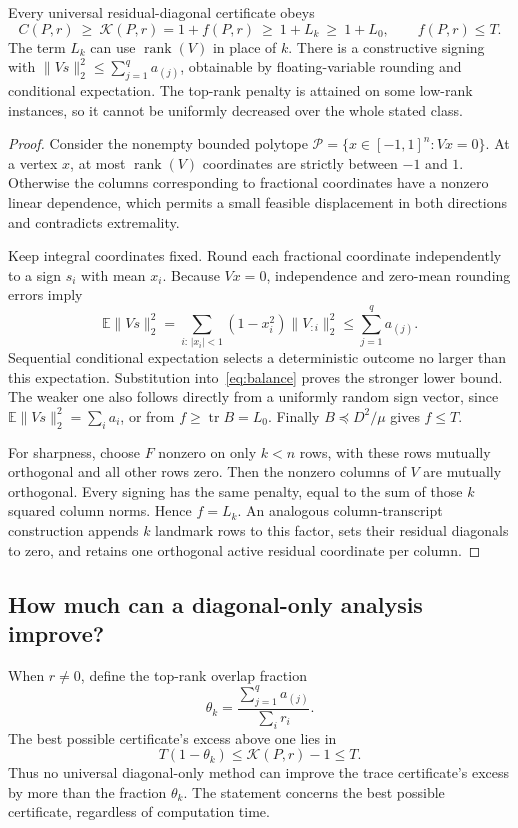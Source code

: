 \documentclass[final,leqno,letterpaper]{etna}
\newcommand{\tr}{\operatorname{tr}}
\renewcommand{\rank}{\operatorname{rank}}
\newcommand{\opt}{\mathcal K}
\begin{document}
\begin{theorem}\label{thm:barrier}
Every universal residual-diagonal certificate obeys
\begin{equation*}
 C(P,r)\ \ge\ \opt(P,r)=1+f(P,r)
 \ \ge\ 1+L_k\ \ge\ 1+L_0,
 \qquad f(P,r)\le T.
\end{equation*}
The term $L_k$ can use $\rank(V)$ in place of $k$. There is a constructive signing with $\|Vs\|_2^2\le\sum_{j=1}^{q}a_{(j)}$, obtainable by floating-variable rounding and conditional expectation. The top-rank penalty is attained on some low-rank instances, so it cannot be uniformly decreased over the whole stated class.
\end{theorem}
\begin{proof}
Consider the nonempty bounded polytope
$\mathcal P=\{x\in[-1,1]^n:Vx=0\}$.
At a vertex $x$, at most $\rank(V)$ coordinates are strictly between $-1$ and $1$. Otherwise the columns corresponding to fractional coordinates have a nonzero linear dependence, which permits a small feasible displacement in both directions and contradicts extremality.

Keep integral coordinates fixed. Round each fractional coordinate independently to a sign $s_i$ with mean $x_i$. Because $Vx=0$, independence and zero-mean rounding errors imply
\begin{equation*}
 \mathbb E\|Vs\|_2^2
 =\sum_{i:\,|x_i|<1}(1-x_i^2)\|V_{:i}\|_2^2
 \le\sum_{j=1}^{q}a_{(j)}.
\end{equation*}
Sequential conditional expectation selects a deterministic outcome no larger than this expectation. Substitution into~\eqref{eq:balance} proves the stronger lower bound. The weaker one also follows directly from a uniformly random sign vector, since $\mathbb E\|Vs\|_2^2=\sum_i a_i$, or from $f\ge\tr B=L_0$. Finally $B\preceq D^2/\mu$ gives $f\le T$.

For sharpness, choose $F$ nonzero on only $k<n$ rows, with these rows mutually orthogonal and all other rows zero. Then the nonzero columns of $V$ are mutually orthogonal. Every signing has the same penalty, equal to the sum of those $k$ squared column norms. Hence $f=L_k$. An analogous column-transcript construction appends $k$ landmark rows to this factor, sets their residual diagonals to zero, and retains one orthogonal active residual coordinate per column.
\end{proof}

\subsection{How much can a diagonal-only analysis improve?}
When $r\ne0$, define the top-rank overlap fraction
\begin{equation*}
 \theta_k=\frac{\sum_{j=1}^{q}a_{(j)}}{\sum_i r_i}.
\end{equation*}
The best possible certificate's excess above one lies in
\begin{equation*}
 T(1-\theta_k)\le \opt(P,r)-1\le T.
\end{equation*}
Thus no universal diagonal-only method can improve the trace certificate's excess by more than the fraction $\theta_k$. The statement concerns the best possible certificate, regardless of computation time.
\end{document}
